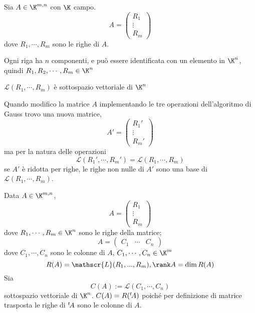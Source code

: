 Sia $A \in \K^{m,n}$ con $\K$ campo. 
\[A=\begin{pmatrix}
    R_1\\ \vdots\\ R_m
\end{pmatrix}\]
dove $R_1, \cdots, R_m$ sono le righe di $A$.

Ogni riga ha $n$ componenti, e può essere identificata con un elemento in $\K^n$, quindi $R_1, R_2, \cdots, R_m \in \K^n$

$ \mathscr{L}(R_1,\cdots,R_m)$ è sottospazio vettoriale di $\K^n$

Quando modifico la matrice $A$ implementando le tre operazioni dell'algoritmo di Gauss trovo una nuova matrice, 
\[A'=\begin{pmatrix}
    R_1'\\ \vdots\\ R_m'
\end{pmatrix}\] 
ma per la natura delle operazioni \[ \mathscr{L}(R_1',\cdots,R_m')= \mathscr{L}(R_1,\cdots,R_m)\] se $A'$ è ridotta per righe, le righe non nulle di $A'$ sono una base di $ \mathscr{L}(R_1,\cdots,R_m) $.


Data $A \in \K^{m,n}$, 
\begin{equation*}
    A=\begin{pmatrix}
        R_1\\ \vdots\\ R_m
    \end{pmatrix}
\end{equation*}
dove $R_1, \cdots, R_m \in \K^n$ sono le righe della matrice; \begin{equation*}
    A=\begin{pmatrix}
        C_1 & \cdots & C_n
    \end{pmatrix}
\end{equation*} dove $C_1, \cdots, C_n$ sono le colonne di $A$, $C_1, \cdots,C_n \in \K^m$
\[
    R(A)= \mathscr{L}(R_1,...,R_m), \rank A=\dim R(A)
\]
Sia 
\[C(A):= \mathscr{L}(C_1,\cdots,C_n)\] sottospazio vettoriale di $\K^n$.
$C(A)=R(\null^t\!A)$ poiché per definizione di matrice trasposta le righe di $\null^t\!A$ sono le colonne di $A$.

